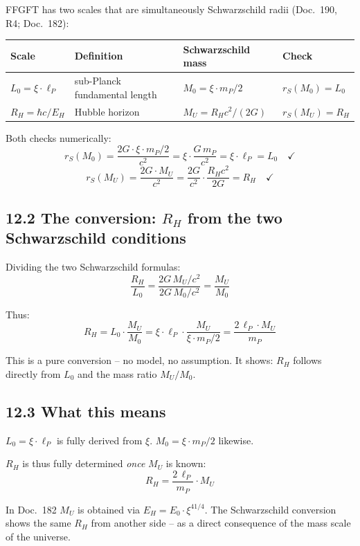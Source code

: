 FFGFT has two scales that are simultaneously Schwarzschild radii
(Doc.~190, R4; Doc.~182):

\begin{center}
\begin{tabular}{p{2.5cm}p{4cm}p{4cm}l}
\toprule
\textbf{Scale} & \textbf{Definition} & \textbf{Schwarzschild mass} & \textbf{Check} \\
\midrule
$L_0 = \xi\cdot\ell_P$ &
  sub-Planck fundamental length &
  $M_0 = \xi\cdot m_P/2$ &
  $r_S(M_0) = L_0$ \\
\addlinespace
$R_H = \hbar c/E_H$ &
  Hubble horizon &
  $M_U = R_H c^2/(2G)$ &
  $r_S(M_U) = R_H$ \\
\bottomrule
\end{tabular}
\end{center}

Both checks numerically:
\[
  r_S(M_0) = \frac{2G\cdot\xi\cdot m_P/2}{c^2}
  = \xi\cdot\frac{G\,m_P}{c^2}
  = \xi\cdot\ell_P = L_0
  \quad\checkmark
\]
\[
  r_S(M_U) = \frac{2G\cdot M_U}{c^2}
  = \frac{2G}{c^2}\cdot\frac{R_H c^2}{2G}
  = R_H
  \quad\checkmark
\]

\subsection*{12.2 The conversion: $R_H$ from the two Schwarzschild conditions}

Dividing the two Schwarzschild formulas:
\[
  \frac{R_H}{L_0}
  = \frac{2G\,M_U/c^2}{2G\,M_0/c^2}
  = \frac{M_U}{M_0}
\]

Thus:
\[
  \boxed{R_H = L_0 \cdot \frac{M_U}{M_0}
  = \xi\cdot\ell_P\cdot\frac{M_U}{\xi\cdot m_P/2}
  = \frac{2\,\ell_P\cdot M_U}{m_P}}
\]

This is a pure conversion -- no model, no assumption.
It shows: $R_H$ follows directly from $L_0$ and the mass ratio
$M_U/M_0$.

\subsection*{12.3 What this means}

$L_0 = \xi\cdot\ell_P$ is fully derived from $\xi$.
$M_0 = \xi\cdot m_P/2$ likewise.

$R_H$ is thus fully determined \emph{once} $M_U$ is known:
\[
  R_H = \frac{2\,\ell_P}{m_P}\cdot M_U
\]

In Doc.~182 $M_U$ is obtained via $E_H = E_0\cdot\xi^{41/4}$.
The Schwarzschild conversion shows the same $R_H$ from another
side -- as a direct consequence of the mass scale of the universe.

